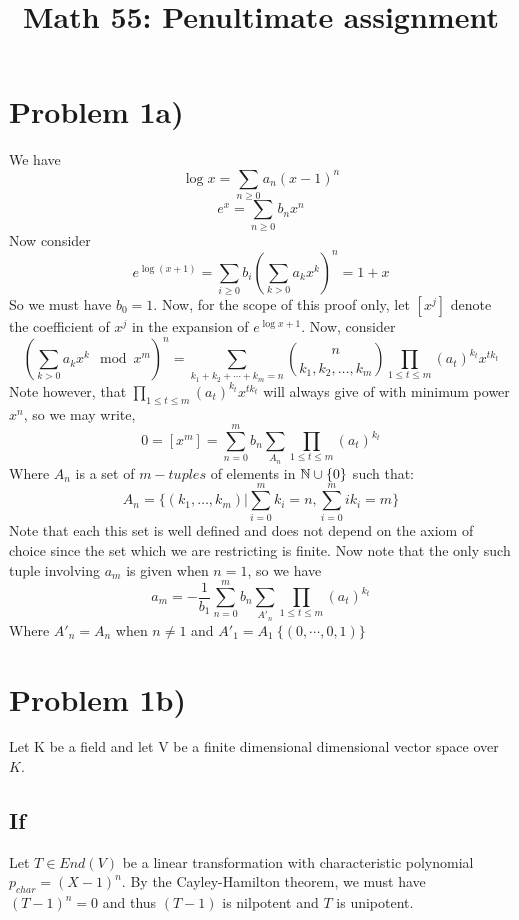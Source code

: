 \title{Math 55: Penultimate assignment}

\maketitle
\section*{Problem 1a)}
We have 
\[ \log x = \sum_{n\geq 0} a_n (x-1)^n \]
\[ e^x = \sum_{n\geq 0} b_n x^n \]
Now consider
\[ e^{\log(x+1)} = \sum_{i\geq 0} b_i \left( \sum_{k > 0} a_k x^k \right)^n  = 1+x \]
So we must have $b_0=1$. Now, for the scope of this proof only, let $[x^j]$ denote the coefficient of $x^j$ in the expansion of $ e^{\log x+1} $. Now, consider
\[ \left( \sum_{k > 0} a_k x^k \mod x^m \right)^n = \sum_{k_1+k_2+\cdots+k_m=n} { n\choose {k_1,k_2,\ldots,k_m}  } \prod_{1\leq t \leq m} (a_t)^{k_t} x^{tk_t} \]
Note however, that $\prod_{1\leq t \leq m} (a_t)^{k_t} x^{tk_t}$ will always give of with minimum power $x^n$, so we may write,
\[ 0=[x^m] = \sum_{n=0}^m b_n \sum_{A_n} \prod_{1\leq t \leq m} (a_t)^{k_t} \]
Where $A_n$ is a set of $m-tuples$ of elements in $\mathbb{N}\cup\{0\}$ such that:
\[ A_n = \{ (k_1,\ldots,k_m) | \sum_{i=0}^m k_i = n, \sum_{i=0}^m i k_i = m \} \]
Note that each this set is well defined and does not depend on the axiom of choice since the set which we are restricting is finite. Now note that the only such tuple involving $a_m$ is given when $n=1$, so we have
\[ a_m = -\frac{1}{b_1} \sum_{n=0}^m b_n \sum_{A'_n} \prod_{1\leq t \leq m} (a_t)^{k_t}\]
Where $A'_n = A_n$ when $n\neq 1$ and $A'_1 = A_1 \ \{(0,\cdots,0,1) \}$ 
\section*{Problem 1b)}
Let K be a field and let V be a finite dimensional dimensional vector space over $K$. 
\subsection*{If}
Let $T\in End(V)$ be a linear transformation with characteristic polynomial $p_{char}=(X-1)^n$. By the Cayley-Hamilton theorem, we must have $(T-1)^n=0$ and thus $(T-1)$ is nilpotent and $T$ is unipotent.
